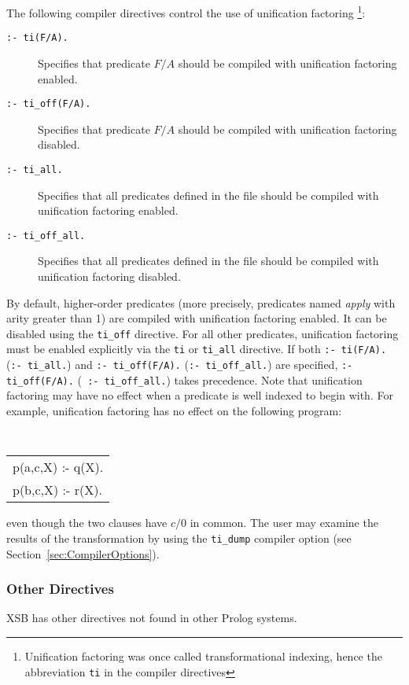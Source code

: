The following compiler directives control the use of unification
factoring \footnote{Unification factoring was once called
transformational indexing, hence the abbreviation {\tt ti} in the
compiler directives}:
\begin{description}
\item[{\tt :- ti(F/A).}] Specifies that predicate $F/A$ should be
	compiled with unification factoring enabled.
\item[{\tt :- ti\_off(F/A).}] Specifies that predicate $F/A$ should be
	compiled with unification factoring disabled.
\item[{\tt :- ti\_all.}] Specifies that all predicates defined in the
	file should be compiled with unification factoring enabled.
\item[{\tt :- ti\_off\_all.}] Specifies that all predicates defined in
	the file should be compiled with unification factoring disabled.
\end{description}
By default, higher-order predicates (more precisely, predicates named
{\it apply\/} with arity greater than 1) are compiled with unification
factoring enabled.  It can be disabled using the {\tt ti\_off}
directive.  For all other predicates, unification factoring must be
enabled explicitly via the {\tt ti} or {\tt ti\_all} directive.  If
both {\tt :- ti(F/A).} ({\tt :- ti\_all.}) and {\tt :- ti\_off(F/A).}
({\tt :- ti\_off\_all.}) are specified, {\tt :- ti\_off(F/A).} ({\tt
:- ti\_off\_all.}) takes precedence.  Note that unification factoring
may have no effect when a predicate is well indexed to begin
with.  For example, unification factoring has no effect on the
following program:
\begin{center}
\tt
\begin{tabular}{l}
p(a,c,X) :- q(X). \\
p(b,c,X) :- r(X).
\end{tabular}
\end{center}
even though the two clauses have $c/0$ in common.  The user may
examine the results of the transformation by using the {\tt ti\_dump}
compiler option (see Section~\ref{sec:CompilerOptions}).

\subsubsection{Other Directives} \label{other-directives}

XSB has other directives not found in other Prolog systems.


